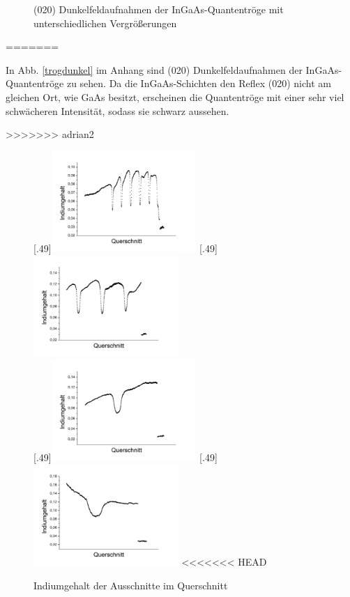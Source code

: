 \documentclass[a4paper,11pt,DIV=11]{scrartcl}
\begin{document}
\begin{figure}[htb]
	\caption{(020) Dunkelfeldaufnahmen der InGaAs-Quantentröge mit unterschiedlichen Vergrößerungen} \label{*}
\end{figure}

=======


In Abb. \ref{trogdunkel} im Anhang sind (020) Dunkelfeldaufnahmen der InGaAs-Quantentröge zu sehen. Da die InGaAs-Schichten den Reflex (020) nicht am gleichen Ort, wie GaAs besitzt, erscheinen die Quantentröge mit einer sehr viel schwächeren Intensität, sodass sie schwarz aussehen.

>>>>>>> adrian2
\begin{figure}[htb]\centering
	[.49\linewidth]{\includegraphics[width=0.49\textwidth]{Versuchsdaten/11/34000xausschnitt.png}}
	[.49\linewidth]{\includegraphics[width=0.49\textwidth]{Versuchsdaten/11/87000xausschnitt.png}}\\
	[.49\linewidth]{\includegraphics[width=0.49\textwidth]{Versuchsdaten/11/185000xausschnitt.png}}
	[.49\linewidth]{\includegraphics[width=0.49\textwidth]{Versuchsdaten/11/380000xausschnitt.png}}
<<<<<<< HEAD
	\caption{Indiumgehalt der Ausschnitte im Querschnitt} \label{ausschnitte}
\end{figure}
\end{document}
